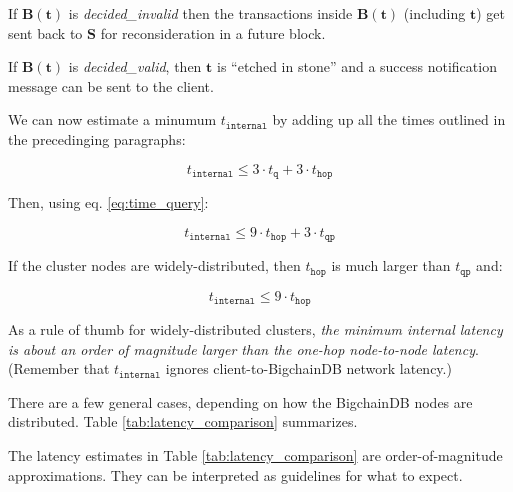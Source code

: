 If $\mathbf{B}(\mathbf{t})$ is \textsf{\textit{decided\_invalid}} then the transactions inside $\mathbf{B}(\mathbf{t})$ (including $\mathbf{t}$) get sent back to $\mathbf{S}$ for reconsideration in a future block.

If $\mathbf{B}(\mathbf{t})$ is \textsf{\textit{decided\_valid}}, then $\mathbf{t}$ is “etched in stone” and a success notification message can be sent to the client.

We can now estimate a minumum $t_\mathtt{internal}$ by adding up all the times outlined in the precedinging paragraphs:

\begin{equation}
 t_\mathtt{internal} \le 3 \cdot t_\mathtt{q} + 3 \cdot t_\mathtt{hop}
\end{equation}

Then, using eq. \eqref{eq:time_query}:

\begin{equation}
 t_\mathtt{internal} \le 9 \cdot t_\mathtt{hop} + 3 \cdot t_\mathtt{qp} 
\end{equation}

If the cluster nodes are widely-distributed, then $t_\mathtt{hop}$ is much larger than $t_\mathtt{qp}$ and:

\begin{equation}
 t_\mathtt{internal} \le 9 \cdot t_\mathtt{hop}
\end{equation}

As a rule of thumb for widely-distributed clusters, \textit{the minimum internal latency is about an order of magnitude larger than the one-hop node-to-node latency}. 
(Remember that $t_\mathtt{internal}$ ignores client-to-BigchainDB network latency.)

\begin{savenotes}
\begin{table}[ht!]
  \caption{Latency based on geography}
  \footnotesize
  \label{tab:latency_comparison}
\end{table}
\end{savenotes}

There are a few general cases, depending on how the BigchainDB nodes are distributed. Table \ref{tab:latency_comparison} summarizes.

The latency estimates in Table \ref{tab:latency_comparison} are order-of-magnitude approximations. They can be interpreted as guidelines for what to expect.